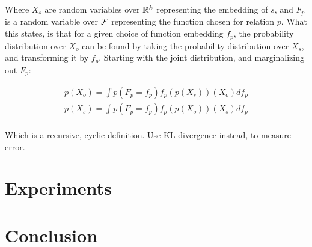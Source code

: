 \documentclass[11pt]{article}
\begin{document}
Where $X_s$ are random variables over ${\mathbb R}^k$ representing the embedding of $s$, and $F_p$ is a random variable over $\cal F$ representing the function chosen for relation $p$. What this states, is that for a given choice of function embedding $f_p$, the probability distribution over $X_o$ can be found by taking the probability distribution over $X_s$, and transforming it by $f_p$. Starting with the joint distribution, and marginalizing out $F_p$:

\begin{align*}
p(X_o) = \int p(F_p = f_p) f_p(p(X_s))(X_o) df_p\\
p(X_s) = \int p(F_p = f_p) f_p(p(X_o))(X_s) df_p\\
\end{align*}

Which is a recursive, cyclic definition. Use KL divergence instead, to measure error.


\section{Experiments}

\section{Conclusion}



\end{document}
